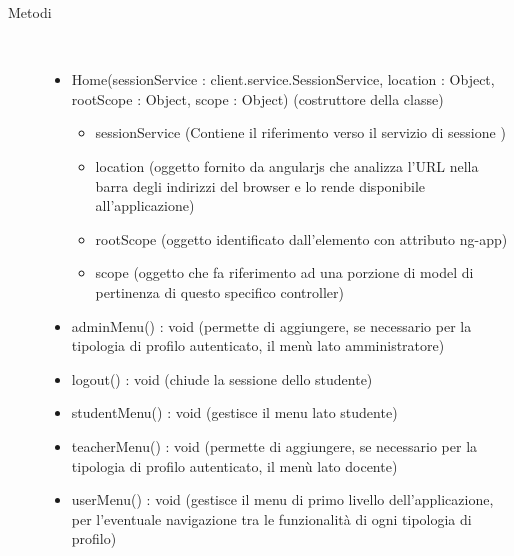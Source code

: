 \begin{description}
\item[Metodi] \hfill \\
 \vspace{-7mm}
\begin{itemize}
\item Home(sessionService : client.service.SessionService, location : Object, rootScope : Object, scope : Object) (costruttore della classe)\begin{itemize}
\item sessionService (Contiene il riferimento verso il servizio di sessione )
\item location (oggetto fornito da angularjs che analizza l'URL nella barra degli indirizzi del browser e lo rende disponibile all'applicazione)
\item rootScope (oggetto identificato dall’elemento con attributo ng-app)
\item scope (oggetto che fa riferimento ad una porzione di model di pertinenza di questo specifico controller)
\end{itemize}

\item adminMenu() : void (permette di aggiungere, se necessario per la tipologia di profilo autenticato, il menù lato amministratore)
\item logout() : void (chiude la sessione dello studente)
\item studentMenu() : void (gestisce il menu lato studente)
\item teacherMenu() : void (permette di aggiungere, se necessario per la tipologia di profilo autenticato, il menù lato docente)
\item userMenu() : void (gestisce il menu di primo livello dell'applicazione, per l'eventuale navigazione tra le funzionalità di ogni tipologia di profilo)
\end{itemize}

\end{description}

